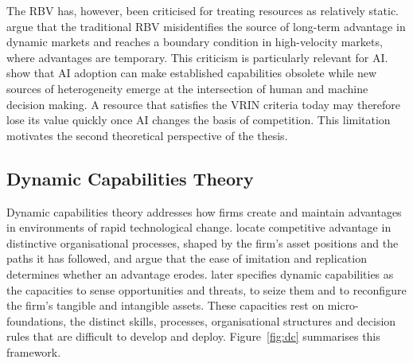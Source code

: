 The RBV has, however, been criticised for treating resources as relatively static. \textcite{eisenhardt2000} argue that the traditional RBV misidentifies the source of long-term advantage in dynamic markets and reaches a boundary condition in high-velocity markets, where advantages are temporary. This criticism is particularly relevant for AI. \textcite{krakowski2023} show that AI adoption can make established capabilities obsolete while new sources of heterogeneity emerge at the intersection of human and machine decision making. A resource that satisfies the VRIN criteria today may therefore lose its value quickly once AI changes the basis of competition. This limitation motivates the second theoretical perspective of the thesis.

\subsection{Dynamic Capabilities Theory}
\label{sec:dctheory}

Dynamic capabilities theory addresses how firms create and maintain advantages in environments of rapid technological change. \textcite{teece1997} locate competitive advantage in distinctive organisational processes, shaped by the firm's asset positions and the paths it has followed, and argue that the ease of imitation and replication determines whether an advantage erodes. \textcite{teece2007} later specifies dynamic capabilities as the capacities to sense opportunities and threats, to seize them and to reconfigure the firm's tangible and intangible assets. These capacities rest on micro-foundations, the distinct skills, processes, organisational structures and decision rules that are difficult to develop and deploy. Figure~\ref{fig:dc} summarises this framework.

